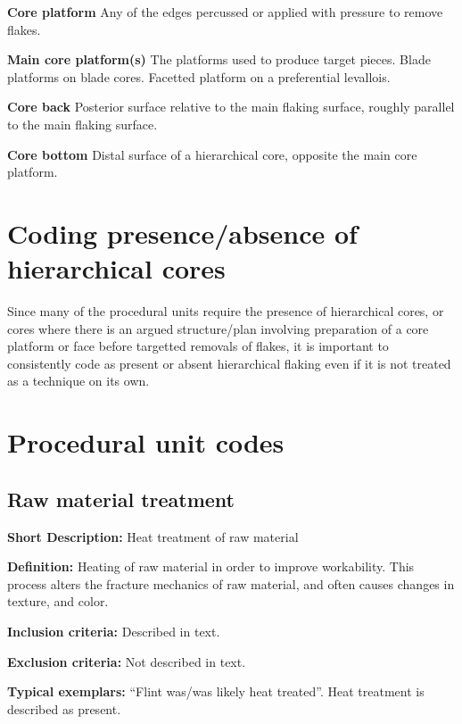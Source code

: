 \documentclass[
]{article}
\begin{document}
\textbf{Core platform} Any of the edges percussed or applied with
pressure to remove flakes.

\textbf{Main core platform(s)} The platforms used to produce target
pieces. Blade platforms on blade cores. Facetted platform on a
preferential levallois.

\textbf{Core back} Posterior surface relative to the main flaking
surface, roughly parallel to the main flaking surface.

\textbf{Core bottom} Distal surface of a hierarchical core, opposite the
main core platform.

\hypertarget{coding-presenceabsence-of-hierarchical-cores}{%
\section{Coding presence/absence of hierarchical
cores}\label{coding-presenceabsence-of-hierarchical-cores}}

Since many of the procedural units require the presence of hierarchical
cores, or cores where there is an argued structure/plan involving
preparation of a core platform or face before targetted removals of
flakes, it is important to consistently code as present or absent
hierarchical flaking even if it is not treated as a technique on its
own.

\hypertarget{procedural-unit-codes}{%
\section{Procedural unit codes}\label{procedural-unit-codes}}

\hypertarget{raw-material-treatment}{%
\subsection{Raw material treatment}\label{raw-material-treatment}}

\textbf{Short Description:} Heat treatment of raw material

\textbf{Definition:} Heating of raw material in order to improve
workability. This process alters the fracture mechanics of raw material,
and often causes changes in texture, and color.

\textbf{Inclusion criteria:} Described in text.

\textbf{Exclusion criteria:} Not described in text.

\textbf{Typical exemplars:} ``Flint was/was likely heat treated''. Heat
treatment is described as present.
\end{document}
